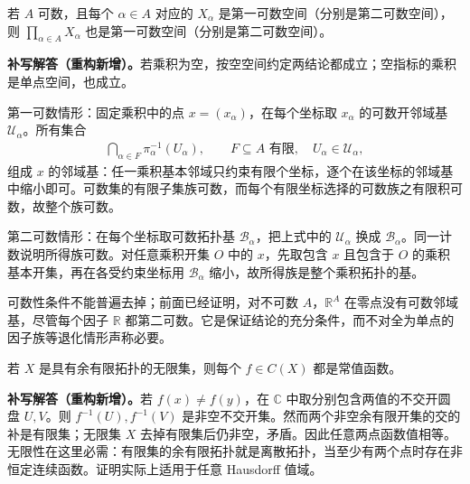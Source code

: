 \documentclass[../../main.tex]{subfiles}%
\begin{document}
\begin{exercise}\label{exercise:ch04-countable-products}
若 $A$ 可数，且每个 $\alpha\in A$ 对应的 $X_\alpha$ 是第一可数空间（分别是第二可数空间），则 $\prod_{\alpha\in A}X_\alpha$ 也是第一可数空间（分别是第二可数空间）。
\end{exercise}
\begin{solution}
\textbf{补写解答（重构新增）。}若乘积为空，按空空间约定两结论都成立；空指标的乘积是单点空间，也成立。

第一可数情形：固定乘积中的点 $x=(x_\alpha)$，在每个坐标取 $x_\alpha$ 的可数开邻域基 $\mathcal U_\alpha$。所有集合
\begin{align*}
\bigcap_{\alpha\in F}\pi_\alpha^{-1}(U_\alpha),
\qquad F\subseteq A\text{ 有限},\quad U_\alpha\in\mathcal U_\alpha,
\end{align*}
组成 $x$ 的邻域基：任一乘积基本邻域只约束有限个坐标，逐个在该坐标的邻域基中缩小即可。可数集的有限子集族可数，而每个有限坐标选择的可数族之有限积可数，故整个族可数。

第二可数情形：在每个坐标取可数拓扑基 $\mathcal B_\alpha$，把上式中的 $\mathcal U_\alpha$ 换成 $\mathcal B_\alpha$。同一计数说明所得族可数。对任意乘积开集 $O$ 中的 $x$，先取包含 $x$ 且包含于 $O$ 的乘积基本开集，再在各受约束坐标用 $\mathcal B_\alpha$ 缩小，故所得族是整个乘积拓扑的基。

可数性条件不能普遍去掉；前面已经证明，对不可数 $A$，$\mathbb R^A$ 在零点没有可数邻域基，尽管每个因子 $\mathbb R$ 都第二可数。它是保证结论的充分条件，而不对全为单点的因子族等退化情形声称必要。
\end{solution}
\begin{exercise}\label{exercise:ch04-cofinite-functions}
若 $X$ 是具有余有限拓扑的无限集，则每个 $f\in C(X)$ 都是常值函数。
\end{exercise}
\begin{solution}
\textbf{补写解答（重构新增）。}若 $f(x)\ne f(y)$，在 $\mathbb C$ 中取分别包含两值的不交开圆盘 $U,V$。则 $f^{-1}(U),f^{-1}(V)$ 是非空不交开集。然而两个非空余有限开集的交的补是有限集；无限集 $X$ 去掉有限集后仍非空，矛盾。因此任意两点函数值相等。无限性在这里必需：有限集的余有限拓扑就是离散拓扑，当至少有两个点时存在非恒定连续函数。证明实际上适用于任意 Hausdorff 值域。
\end{solution}
\end{document}

